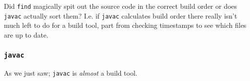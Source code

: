 Did \texttt{find} magically spit out the source code in the correct build order
or does \texttt{javac} actually sort them? I.e. if \texttt{javac} calculates build order
there really isn't much left to do for a build tool, part from checking
timestamps to see which files are up to date.



\subsubsection{ \texttt{javac} }

As we just saw; \texttt{javac} is \textit{almost} a build tool.


